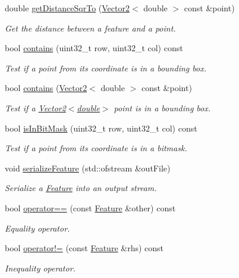 \begin{DoxyCompactItemize}
double \hyperlink{classfc_1_1Feature_a21626e0da332bd17ef8b50b137c6e696}{get\+Distance\+Sqr\+To} (\hyperlink{classfc_1_1Vector2}{Vector2}$<$ double $>$ const \&point)
\begin{DoxyCompactList}\small\item\em Get the distance between a feature and a point. \end{DoxyCompactList}\item 
bool \hyperlink{classfc_1_1Feature_ae1c529caa66d56edfb361431a832f806}{contains} (uint32\+\_\+t row, uint32\+\_\+t col) const
\begin{DoxyCompactList}\small\item\em Test if a point from its coordinate is in a bounding box. \end{DoxyCompactList}\item 
bool \hyperlink{classfc_1_1Feature_a0f716104b68b033b427c60c1f2672a76}{contains} (\hyperlink{classfc_1_1Vector2}{Vector2}$<$ double $>$ const \&point)
\begin{DoxyCompactList}\small\item\em Test if a \hyperlink{classfc_1_1Vector2}{Vector2$<$double$>$} point is in a bounding box. \end{DoxyCompactList}\item 
bool \hyperlink{classfc_1_1Feature_a8cd5e2721373377bb80d87dd72265f98}{is\+In\+Bit\+Mask} (uint32\+\_\+t row, uint32\+\_\+t col) const
\begin{DoxyCompactList}\small\item\em Test if a point from its coordinate is in a bitmask. \end{DoxyCompactList}\item 
void \hyperlink{classfc_1_1Feature_ac37080e8b096f9d2024e761f18495578}{serialize\+Feature} (std\+::ofstream \&out\+File)
\begin{DoxyCompactList}\small\item\em Serialize a \hyperlink{classfc_1_1Feature}{Feature} into an output stream. \end{DoxyCompactList}\item 
bool \hyperlink{classfc_1_1Feature_aba149cb57c347382caee231a8637f2a3}{operator==} (const \hyperlink{classfc_1_1Feature}{Feature} \&other) const
\begin{DoxyCompactList}\small\item\em Equality operator. \end{DoxyCompactList}\item 
bool \hyperlink{classfc_1_1Feature_a04bfee2095c243b512be2fc53b0ea08c}{operator!=} (const \hyperlink{classfc_1_1Feature}{Feature} \&rhs) const
\begin{DoxyCompactList}\small\item\em Inequality operator. \end{DoxyCompactList}\end{DoxyCompactItemize}
